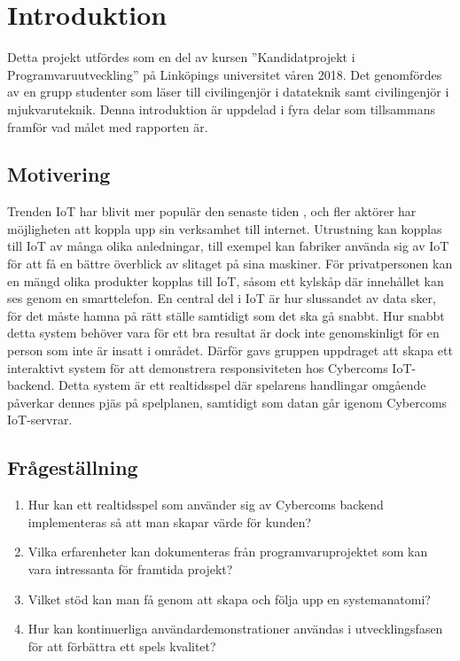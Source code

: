 \chapter{Introduktion}
\label{cha:introduction}
Detta projekt utfördes som en del av kursen ''Kandidatprojekt i Programvaruutveckling'' på Linköpings universitet våren 2018. Det genomfördes av en grupp studenter som läser till civilingenjör i datateknik samt civilingenjör i mjukvaruteknik.
Denna introduktion är uppdelad i fyra delar som tillsammans framför vad målet med rapporten är.

\section{Motivering}
\label{sec:motivation}
Trenden IoT har blivit mer populär den senaste tiden \cite{IoT-ecosystem}, och fler aktörer har möjligheten att koppla upp sin verksamhet till internet. Utrustning kan kopplas till IoT av många olika anledningar, till exempel kan fabriker använda sig av IoT för att få en bättre överblick av slitaget på sina maskiner. För privatpersonen kan en mängd olika produkter kopplas till IoT, såsom ett kylskåp där innehållet kan ses genom en smarttelefon. En central del i IoT är hur slussandet av data sker, för det måste hamna på rätt ställe samtidigt som det ska gå snabbt. Hur snabbt detta system behöver vara för ett bra resultat är dock inte genomskinligt för en person som inte är insatt i området. Därför gavs gruppen uppdraget att skapa ett interaktivt system för att demonstrera responsiviteten hos Cybercoms IoT-backend. Detta system är ett realtidsspel där spelarens handlingar omgående påverkar dennes pjäs på spelplanen, samtidigt som datan går igenom Cybercoms IoT-servrar.


\section{Frågeställning}

\begin{enumerate}
	\item \label{fs:fs_1} Hur kan ett realtidsspel som använder sig av Cybercoms backend implementeras så att man skapar värde för kunden?
	\item \label{fs:fs_2} Vilka erfarenheter kan dokumenteras från programvaruprojektet som kan vara intressanta för framtida projekt?
	\item \label{fs:fs_3} Vilket stöd kan man få genom att skapa och följa upp en systemanatomi?
	\item \label{fs:fs_4} Hur kan kontinuerliga användardemonstrationer användas i utvecklingsfasen för att förbättra ett spels kvalitet?

\end{enumerate}

